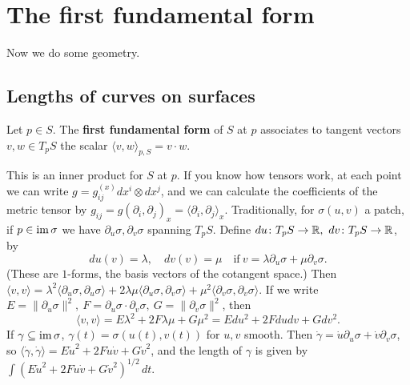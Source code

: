 \section{The first fundamental form}
Now we do some geometry. 
\subsection{Lengths of curves on surfaces}
\begin{definition}[]
    Let $p \in S$. The \textbf{first fundamental form} of $S$ at $p$ associates to tangent vectors $v,w \in T_pS$ the scalar $\langle v,w \rangle _{p,S}=v\cdot w.$
\end{definition}
This is an inner product for $S$ at $p$. If you know how tensors work, at each point we can write $g=g^{(x)}_{ij}dx^i \otimes dx^j $, and we can calculate the coefficients of the metric tensor by $g_{ij}=g(\partial _i ,\partial _j )_x=\langle \partial _i ,\partial _j  \rangle _x$. Traditionally, for $\sigma(u,v)$ a patch, if $p \in \operatorname{im} \sigma$ we have $\partial _u\sigma,\partial _v\sigma$ spanning $T_pS$. Define $du \colon T_pS \to \mathbb{R},\ dv \colon T_p S \to \mathbb{R}$, by \[
    du(v)=\lambda,\quad dv(v)=\mu \quad \text{if} \ v=\lambda \partial _u\sigma +\mu \partial _v\sigma.
\] (These are $1$-forms, the basis vectors of the cotangent space.) Then $\langle v,v \rangle =\lambda ^2\langle \partial _u\sigma,\partial _u\sigma \rangle +2\lambda \mu \langle \partial _u\sigma,\partial _v\sigma \rangle +\mu^2\langle \partial _v\sigma,\partial _v\sigma \rangle $. If we write $E=\|\partial _u\sigma\|^2,\ F=\partial _u\sigma \cdot \partial _v\sigma,\ G=\|\partial _v\sigma\|^2$, then \[
\langle v,v \rangle =E\lambda^2+2F\lambda \mu+G\mu^2=Edu^2+2Fdudv+Gdv^2.
\] If $\gamma \subseteq \operatorname{im} \sigma$, $\gamma (t)=\sigma(u(t),v(t))$ for $u,v$ smooth. Then $\dot \gamma =\dot u\partial _u\sigma+\dot v\partial _v\sigma$, so $\langle \dot \gamma ,\dot \gamma  \rangle =E\dot u^2+2F\dot u\dot v+G\dot v^2$, and the length of $\gamma $ is given by $\int (E\dot u^2+2F\dot u\dot v+G\dot v^2)^{1 /2} \, dt$.

